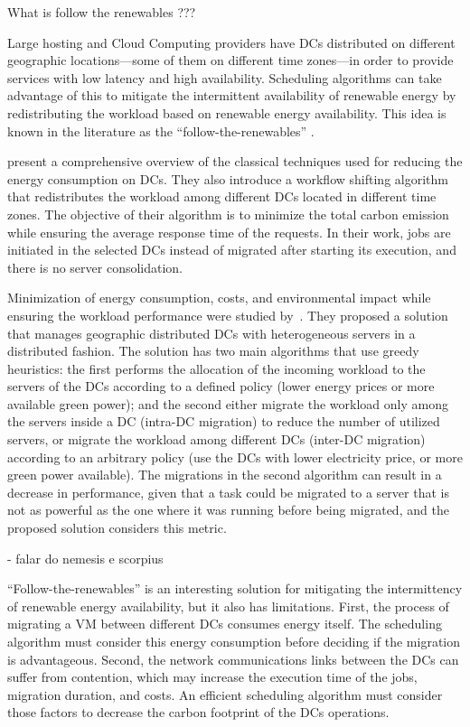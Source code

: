 \label{sec:followtherenewables}

What is follow the renewables ???


Large hosting and Cloud Computing providers have DCs distributed on
different geographic locations---some of them on different time
zones---in order to provide services with low latency and high
availability. Scheduling algorithms can take advantage of this to
mitigate the intermittent availability of renewable energy by
redistributing the workload based on renewable energy
availability. This idea is known in the literature as the
``follow-the-renewables'' \cite{shuja2016sustainable}. 



\cite{XU2020191} present a comprehensive overview of the classical
techniques used for reducing the energy consumption on DCs. They also
introduce a workflow shifting algorithm that redistributes the
workload among different DCs located in different time zones. The
objective of their algorithm is to minimize the total carbon emission
while ensuring the average response time of the requests. In their
work, jobs are initiated in the selected DCs instead of migrated after
starting its execution, and there is no server consolidation.


Minimization of energy consumption, costs, and environmental impact
while ensuring the workload performance were studied
by~\cite{ALI2021110907}. They proposed a solution that manages
geographic distributed DCs with heterogeneous servers in a distributed
fashion. The solution has two main algorithms that use greedy
heuristics: the first performs the allocation of the incoming workload
to the servers of the DCs according to a defined policy (lower energy
prices or more available green power); and the second either migrate
the workload only among the servers inside a DC (intra-DC migration)
to reduce the number of utilized servers, or migrate the workload
among different DCs (inter-DC migration) according to an arbitrary
policy (use the DCs with lower electricity price, or more green power
available). The migrations in the second algorithm can result in a
decrease in performance, given that a task could be migrated to a
server that is not as powerful as the one where it was running before
being migrated, and the proposed solution considers this metric.



- falar do nemesis e scorpius


``Follow-the-renewables'' is an interesting solution for mitigating
the intermittency of renewable energy availability, but it also has
limitations. First, the process of migrating a VM between different
DCs consumes energy itself. The scheduling algorithm must consider
this energy consumption before deciding if the migration is
advantageous. Second, the network communications links between the DCs
can suffer from contention, which may increase the execution time of
the jobs, migration duration, and costs. An efficient scheduling
algorithm must consider those factors to decrease the carbon footprint
of the DCs operations.


